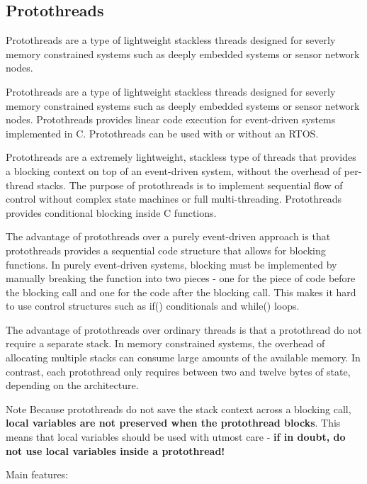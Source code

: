 \hypertarget{a00052}{\subsection{\-Protothreads}
\label{a00052}
}


\-Protothreads are a type of lightweight stackless threads designed for severly memory constrained systems such as deeply embedded systems or sensor network nodes.  


\-Protothreads are a type of lightweight stackless threads designed for severly memory constrained systems such as deeply embedded systems or sensor network nodes. \-Protothreads provides linear code execution for event-\/driven systems implemented in \-C. \-Protothreads can be used with or without an \-R\-T\-O\-S.

\-Protothreads are a extremely lightweight, stackless type of threads that provides a blocking context on top of an event-\/driven system, without the overhead of per-\/thread stacks. \-The purpose of protothreads is to implement sequential flow of control without complex state machines or full multi-\/threading. \-Protothreads provides conditional blocking inside \-C functions.

\-The advantage of protothreads over a purely event-\/driven approach is that protothreads provides a sequential code structure that allows for blocking functions. \-In purely event-\/driven systems, blocking must be implemented by manually breaking the function into two pieces -\/ one for the piece of code before the blocking call and one for the code after the blocking call. \-This makes it hard to use control structures such as if() conditionals and while() loops.

\-The advantage of protothreads over ordinary threads is that a protothread do not require a separate stack. \-In memory constrained systems, the overhead of allocating multiple stacks can consume large amounts of the available memory. \-In contrast, each protothread only requires between two and twelve bytes of state, depending on the architecture.

\begin{DoxyNote}{\-Note}
\-Because protothreads do not save the stack context across a blocking call, {\bfseries local variables are not preserved when the protothread blocks}. \-This means that local variables should be used with utmost care -\/ {\bfseries if in doubt, do not use local variables inside a protothread!}
\end{DoxyNote}
\-Main features\-:


